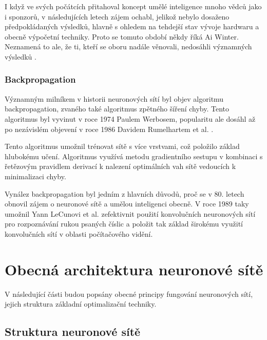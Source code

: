 
I když ve svých počátcích přitahoval koncept umělé inteligence mnoho vědců jako
i sponzorů, v následujících letech zájem ochabl, jelikož nebylo dosaženo
předpokládaných výsledků, hlavně s ohledem na tehdejší stav vývoje hardwaru a
obecně výpočetní techniky. Proto se tomuto období někdy říká Ai Winter.
Neznamená to ale, že ti, kteří se oboru nadále věnovali, nedosáhli významných
výsledků \cite{nn_history}.

\subsubsection*{Backpropagation}
Významným milníkem v historii neuronových sítí byl objev algoritmu
backpropagation, zvaného také algoritmus zpětného šíření chyby. Tento
algoritmus byl vyvinut v roce 1974 Paulem Werbosem, popularitu ale dosáhl až po
nezávislém objevení v roce 1986 Davidem Rumelhartem et al.
\cite{backpropagation}.

Tento algoritmus umožnil trénovat sítě s více vrstvami, což položilo základ
hlubokému učení. Algoritmus využívá metodu gradientního sestupu v kombinaci s
řetězovým pravidlem derivací k nalezení optimálních vah sítě vedoucích k
minimalizaci chyby.

Vynález backpropagation byl jedním z hlavních důvodů, proč se v 80. letech
obnovil zájem o neuronové sítě a umělou inteligenci obecně. V roce 1989 taky
umožnil Yann LeCunovi et al. zefektivnit použití konvolučních neuronových sítí
pro rozpoznávání rukou psaných číslic \cite{lecun1989} a položit tak základ
širokému využití konvolučních sítí v oblasti počítačového vidění.

\section{Obecná architektura neuronové sítě}

V následující části budou popsány obecné principy fungování neuronových sítí,
jejich struktura základní optimalizační techniky.

\subsection{Struktura neuronové sítě}

